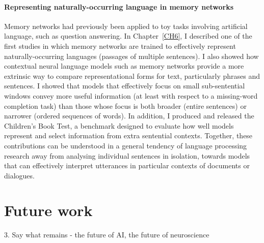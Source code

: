 \paragraph{Representing naturally-occurring language in memory networks} Memory networks had previously been applied to toy tasks involving artificial language, such as question answering. In Chapter~\ref{CH6}, I described one of the first studies in which memory networks are trained to effectively represent naturally-occurring languages (passages of multiple sentences). I also showed how contextual neural language models such as memory networks provide a more extrinsic way to compare representational forms for text, particularly phrases and sentences. I showed that models that effectively focus on small sub-sentential windows convey more useful information (at least with respect to a missing-word completion task) than those whose focus is both broader (entire sentences) or narrower (ordered sequences of words). In addition, I produced and released the Children's Book Test, a benchmark designed to evaluate how well models represent and select information from extra sentential contexts. Together, these contributions can be understood in a general tendency of language processing research away from analysing individual sentences in isolation, towards models that can effectively interpret utterances in particular contexts of documents or dialogues.  

\section{Future work}
3. Say what remains - the future of AI, the future of neuroscience